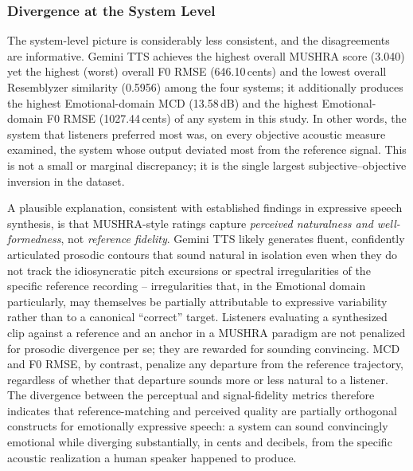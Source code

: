 \documentclass[a4paper,fleqn]{cas-dc}
\begin{document}
    \subsubsection{Divergence at the System Level}
    
    \hspace*{1.2em} The system-level picture is considerably less consistent, and the disagreements are informative. Gemini TTS achieves the highest overall MUSHRA score (3.040) yet the highest (worst) overall F0 RMSE (646.10\,cents) and the lowest overall Resemblyzer similarity (0.5956) among the four systems; it additionally produces the highest Emotional-domain MCD
    (13.58\,dB) and the highest Emotional-domain F0 RMSE (1027.44\,cents) of
    any system in this study. In other words, the system that listeners
    preferred most was, on every objective acoustic measure examined, the
    system whose output deviated most from the reference signal. This is not
    a small or marginal discrepancy; it is the single largest subjective–objective inversion in the dataset.
    
    \begin{sloppypar}
    \hspace*{1.2em} A plausible explanation, consistent with established findings in expressive speech synthesis, is that MUSHRA-style ratings capture
    \textit{perceived naturalness and well-formedness}, not
    \textit{reference fidelity}. Gemini TTS likely generates fluent,
    confidently articulated prosodic contours that sound natural in isolation
    even when they do not track the idiosyncratic pitch excursions or
    spectral irregularities of the specific reference recording -- irregularities
    that, in the Emotional domain particularly, may themselves be partially
    attributable to expressive variability rather than to a canonical ``correct''
    target. Listeners evaluating a synthesized clip against a reference and an
    anchor in a MUSHRA paradigm are not penalized for prosodic divergence per se;
    they are rewarded for sounding convincing. MCD and F0 RMSE, by contrast,
    penalize any departure from the reference trajectory, regardless of whether
    that departure sounds more or less natural to a listener. The divergence
    between the perceptual and signal-fidelity metrics therefore indicates that
    reference-matching and perceived quality are partially orthogonal
    constructs for emotionally expressive speech: a system can sound
    convincingly emotional while diverging substantially, in cents and decibels,
    from the specific acoustic realization a human speaker happened to produce.
    \end{sloppypar}
    
\end{document}
